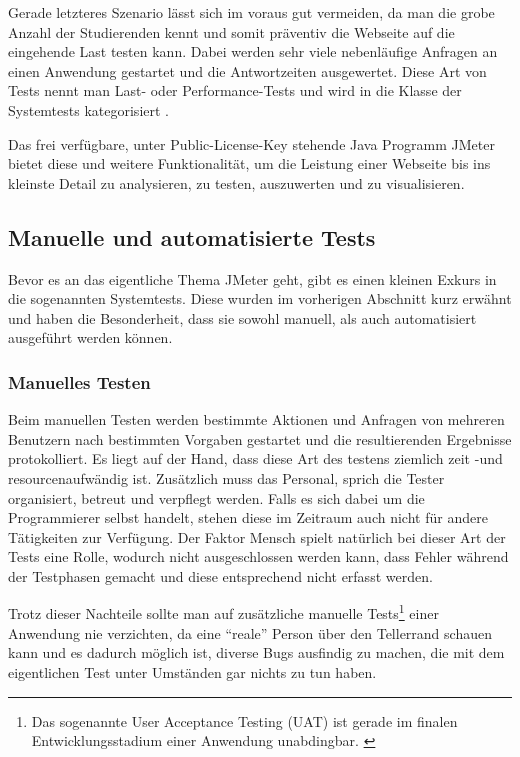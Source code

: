 \documentclass[a4paper,12pt]{article}
\begin{document}
Gerade letzteres Szenario lässt sich im voraus gut vermeiden, da man die grobe Anzahl der Studierenden kennt und somit präventiv die Webseite auf die eingehende Last testen kann. Dabei werden sehr viele nebenläufige Anfragen an einen Anwendung gestartet und die Antwortzeiten ausgewertet. Diese Art von Tests nennt man Last- oder Performance-Tests und wird in die Klasse der Systemtests kategorisiert \cite{online:LastUndPerformanceTest}. 

Das frei verfügbare, unter Public-License-Key stehende Java Programm JMeter bietet diese und weitere Funktionalität, um die Leistung einer Webseite bis ins kleinste Detail zu analysieren, zu testen, auszuwerten und zu visualisieren.

\subsection{Manuelle und automatisierte Tests}
Bevor es an das eigentliche Thema JMeter geht, gibt es einen kleinen Exkurs in die sogenannten Systemtests. Diese wurden im vorherigen Abschnitt kurz erwähnt und haben die Besonderheit, dass sie sowohl manuell, als auch automatisiert ausgeführt werden können. 

\subsubsection{Manuelles Testen}
Beim manuellen Testen werden bestimmte Aktionen und Anfragen von mehreren Benutzern nach bestimmten Vorgaben gestartet und die resultierenden Ergebnisse protokolliert. Es liegt auf der Hand, dass diese Art des testens ziemlich zeit -und resourcenaufwändig ist. Zusätzlich muss das Personal, sprich die Tester organisiert, betreut und verpflegt werden. Falls es sich dabei um die Programmierer selbst handelt, stehen diese im Zeitraum auch nicht für andere Tätigkeiten zur Verfügung. Der Faktor Mensch spielt natürlich bei dieser Art der Tests eine Rolle, wodurch nicht ausgeschlossen werden kann, dass Fehler während der Testphasen gemacht und diese entsprechend nicht erfasst werden. \cite[S. 11]{book:ApacheJMeter}

Trotz dieser Nachteile sollte man auf zusätzliche manuelle Tests\footnote{Das sogenannte User Acceptance Testing (UAT) ist gerade im finalen Entwicklungsstadium einer Anwendung unabdingbar. \cite{online:wikiUAT}} einer Anwendung nie verzichten, da eine "`reale"' Person über den Tellerrand schauen kann und es dadurch möglich ist, diverse Bugs ausfindig zu machen, die mit dem eigentlichen Test unter Umständen gar nichts zu tun haben.
\end{document}
